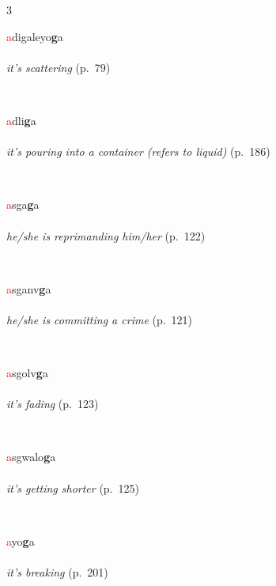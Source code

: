 \documentclass[oneside,openany]{book}%
\begin{document}
\noindent\begin{multicols}{3}%
\begin{minipage}[t]{\linewidth}
\raggedright\noindent \textcolor{Red}{a}digaleyo\textbf{g}a\\
\\
\noindent \textit{it's scattering} (p.~79)
\end{minipage}\\[1em]%
\begin{minipage}[t]{\linewidth}
\raggedright\noindent \textcolor{Red}{a}dli\textbf{g}a\\
\\
\noindent \textit{it's pouring into a container (refers to liquid)} (p.~186)
\end{minipage}\\[1em]%
\begin{minipage}[t]{\linewidth}
\raggedright\noindent \textcolor{Red}{a}sga\textbf{g}a\\
\\
\noindent \textit{he/she is reprimanding him/her} (p.~122)
\end{minipage}\\[1em]%
\begin{minipage}[t]{\linewidth}
\raggedright\noindent \textcolor{Red}{a}sganv\textbf{g}a\\
\\
\noindent \textit{he/she is committing a crime} (p.~121)
\end{minipage}\\[1em]%
\begin{minipage}[t]{\linewidth}
\raggedright\noindent \textcolor{Red}{a}sgolv\textbf{g}a\\
\\
\noindent \textit{it's fading} (p.~123)
\end{minipage}\\[1em]%
\begin{minipage}[t]{\linewidth}
\raggedright\noindent \textcolor{Red}{a}sgwalo\textbf{g}a\\
\\
\noindent \textit{it's getting shorter} (p.~125)
\end{minipage}\\[1em]%
\begin{minipage}[t]{\linewidth}
\raggedright\noindent \textcolor{Red}{a}yo\textbf{g}a\\
\\
\noindent \textit{it's breaking} (p.~201)
\end{minipage}\\[1em]%
\end{multicols}%
\vspace{1em}%
\needspace{3in}%
\end{document}
